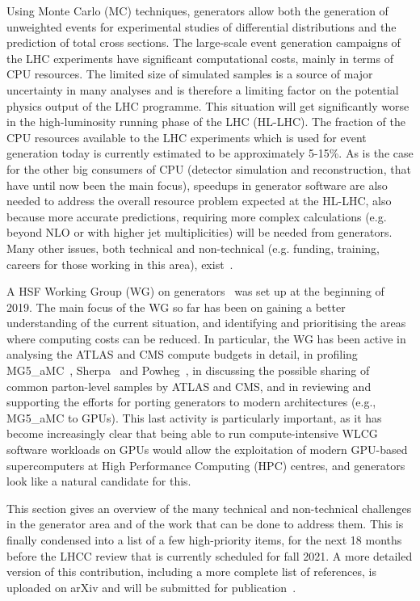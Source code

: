 \documentclass[11pt,a4paper]{article}
\begin{document}
Using Monte Carlo (MC) techniques, generators allow both the generation
of unweighted events for experimental studies of differential
distributions and the prediction of total cross sections. The
large-scale event generation campaigns of the LHC experiments have
significant computational costs, mainly in terms of CPU resources. The
limited size of simulated samples is a source of major uncertainty in
many analyses and is therefore a limiting factor on the potential
physics output of the LHC programme. This situation will get
significantly worse in the high-luminosity running phase of the LHC
(HL-LHC). The fraction of the CPU resources available to the LHC
experiments which is used for event generation today is currently
estimated to be approximately 5-15\%. As is the case for the other big
consumers of CPU (detector simulation and reconstruction, that have
until now been the main focus), speedups in generator software are also
needed to address the overall resource problem expected at the HL-LHC,
also because more accurate predictions, requiring more complex
calculations (e.g. beyond NLO or with higher jet multiplicities) will be
needed from generators. Many other issues, both technical and
non-technical (e.g. funding, training, careers for those working in this
area), exist~\cite{Alves:2017she,Gen18}.

A HSF Working Group (WG) on generators~\cite{Gen19} was set up at the
beginning of 2019. The main focus of the WG so far has been on gaining a
better understanding of the current situation, and identifying and
prioritising the areas where computing costs can be reduced. In
particular, the WG has been active in analysing the ATLAS and CMS
compute budgets in detail, in profiling MG5\_aMC~\cite{Alw14}, 
Sherpa~\cite{Bot19} and Powheg~\cite{Fri07}, in discussing the possible sharing
of common parton-level samples by ATLAS and CMS, and in reviewing and
supporting the efforts for porting generators to modern architectures
(e.g., MG5\_aMC to GPUs). This last activity is particularly important,
as it has become increasingly clear that being able to run
compute-intensive WLCG software workloads on GPUs would allow the
exploitation of modern GPU-based supercomputers at High Performance
Computing (HPC) centres, and generators look like a natural candidate
for this.

This section gives an overview of the many technical and non-technical
challenges in the generator area and of the work that can be done to
address them. This is finally condensed into a list of a few
high-priority items, for the next 18 months before the LHCC review that
is currently scheduled for fall 2021. A more detailed version of this
contribution, including a more complete list of references, is
uploaded on arXiv and will be submitted for publication~\cite{Gen20}.
\end{document}
